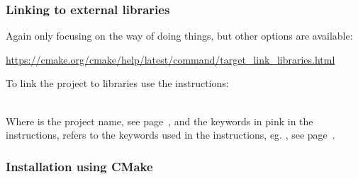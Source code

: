 \subsubsection*{Linking to external libraries}
\label{clink}
Again only focusing on the  way of doing things, but other options are available:
\begin{center}\href{https://cmake.org/cmake/help/latest/command/target\_link\_libraries.html}{https://cmake.org/cmake/help/latest/command/target\_link\_libraries.html} \end{center}
To link the project to libraries use the  instructions:
\begin{script}
\end{script}
\\[-0.25cm]
\noindent Where  is the project name, see page~\pageref{cmake_pname}, and the keywords in pink in the  instructions, 
refers to the keywords used in the  instructions, eg. \texttt{}, see page~\pageref{cmake_deps}.

\newpage
\subsubsection*{Installation using CMake}

